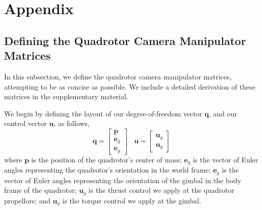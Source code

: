 

\section{Appendix}

\subsection{Defining the Quadrotor Camera Manipulator Matrices}
\label{sec:ch2:manipulator}

In this subsection, we define the quadrotor camera manipulator matrices, attempting to be as concise as possible.
We include a detailed derivation of these matrices in the supplementary material.

We begin by defining the layout of our degree-of-freedom vector $\mathbf{q}$, and our control vector $\mathbf{u}$, as follows,
%
\begin{equation}
\mathbf{q} = 
\begin{bmatrix}
\mathbf{p} \\
\mathbf{e}_q \\
\mathbf{e}_g
\end{bmatrix}
%
~~~~
\mathbf{u} = 
\begin{bmatrix}
\mathbf{u}_q \\
\mathbf{u}_g
\end{bmatrix}
\end{equation}
%
where $\mathbf{p}$ is the position of the quadrotor's center of mass; $\mathbf{e}_q$ is the vector of Euler angles representing the quadrotor's orientation in the world frame; $\mathbf{e}_g$ is the vector of Euler angles representing the orientation of the gimbal in the body frame of the quadrotor; $\mathbf{u}_q$ is the thrust control we apply at the quadrotor propellors; and $\mathbf{u}_g$ is the torque control we apply at the gimbal.


